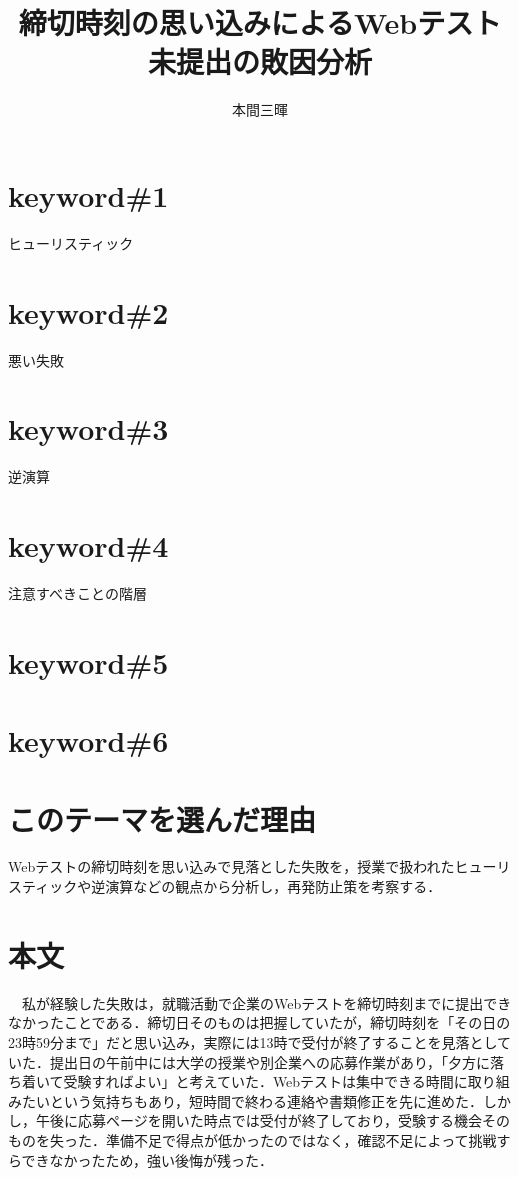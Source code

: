 \documentclass[titlepage,a4paper]{jsarticle}
\title{締切時刻の思い込みによるWebテスト未提出の敗因分析}
\author{本間三暉}
\begin{document}
\maketitle
\section*{keyword\#1}
ヒューリスティック
\section*{keyword\#2}
悪い失敗
\section*{keyword\#3}
逆演算
\section*{keyword\#4}
注意すべきことの階層
\section*{keyword\#5}

\section*{keyword\#6}

\section{このテーマを選んだ理由}
Webテストの締切時刻を思い込みで見落とした失敗を，授業で扱われたヒューリスティックや逆演算などの観点から分析し，再発防止策を考察する．

\section{本文}

　私が経験した失敗は，就職活動で企業のWebテストを締切時刻までに提出できなかったことである．締切日そのものは把握していたが，締切時刻を「その日の23時59分まで」だと思い込み，実際には13時で受付が終了することを見落としていた．提出日の午前中には大学の授業や別企業への応募作業があり，「夕方に落ち着いて受験すればよい」と考えていた．Webテストは集中できる時間に取り組みたいという気持ちもあり，短時間で終わる連絡や書類修正を先に進めた．しかし，午後に応募ページを開いた時点では受付が終了しており，受験する機会そのものを失った．準備不足で得点が低かったのではなく，確認不足によって挑戦すらできなかったため，強い後悔が残った．
\end{document}
